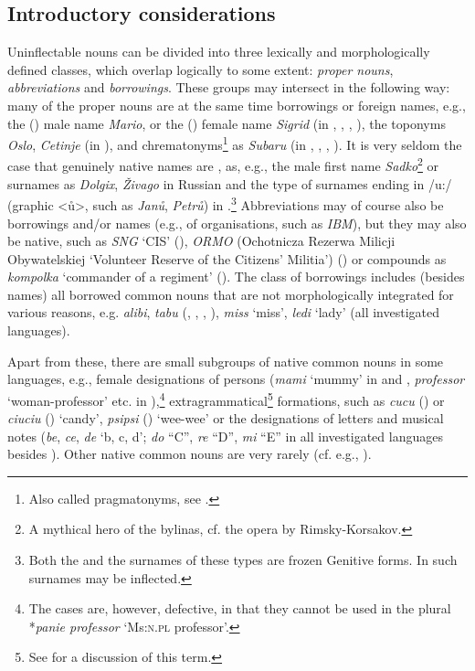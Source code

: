 \documentclass[output=paper,colorlinks,citecolor=brown]{langscibook}
\begin{document}
\subsection{Introductory considerations}

Uninflectable nouns can be divided into three lexically and morphologically defined classes, which overlap logically to some extent: \emph{proper nouns}, \emph{abbreviations} and \emph{borrowings}. These groups may intersect in the following way: many of the  proper nouns are at the same time borrowings or foreign names, e.g., the () male name \emph{Mario}, or the () female name \emph{Sigrid} (in , , , ), the toponyms \emph{Oslo}, \emph{Cetinje} (in ), and chrematonyms\footnote{Also called pragmatonyms, see \citet{zgusta1996}.} as \emph{Subaru} (in , , , ). It is very seldom the case that genuinely native names are , as, e.g., the  male first name \emph{Sadko}\footnote{A mythical hero of the bylinas, cf. the opera by Rimsky-Korsakov.} or  surnames as \emph{Dolgix}, \emph{Živago} in Russian and the  type of surnames ending in /u:/ (graphic \textless ů\textgreater{}, such as \emph{Janů}, \emph{Petrů}) in .\footnote{Both the  and the  surnames of these types are frozen Genitive forms. In  such surnames may be inflected.} Abbreviations may of course also be borrowings and/or names (e.g., of organisations, such as \emph{IBM}), but they may also be native, such as \emph{SNG} `CIS' (), \emph{ORMO} (Ochotnicza Rezerwa Milicji Obywatelskiej `Volunteer Reserve of the Citizens' Militia') () or compounds as \emph{kompolka} `commander of a regiment' (). The class of borrowings includes (besides names) all borrowed common nouns that are not morphologically integrated for various reasons, e.g. \emph{alibi}, \emph{tabu} (, , , ), \emph{miss} `miss', \emph{ledi} `lady' (all investigated languages).

Apart from these, there are small subgroups of native  common nouns in some languages, e.g., female designations of persons (\emph{mami} `mummy' in  and , \emph{professor} `woman-professor' etc. in ),\footnote{The  cases are, however, defective, in that they cannot be used in the plural *\emph{panie professor} `Ms:\textsc{n.pl} professor'.} extragrammatical\footnote{See \citet{dressler2000} for a discussion of this term.} formations, such as \emph{cucu} () or \emph{ciuciu} () `candy', \emph{psipsi} () `wee-wee' or the designations of letters and musical notes (\emph{be}, \emph{ce}, \emph{de} `b, c, d'; \emph{do} ``C'', \emph{re} ``D'', \emph{mi} ``E'' in all investigated languages besides ). Other native common nouns are very rarely  (cf. e.g., \citealt[18]{krzyzanowski2013}).
\end{document}
